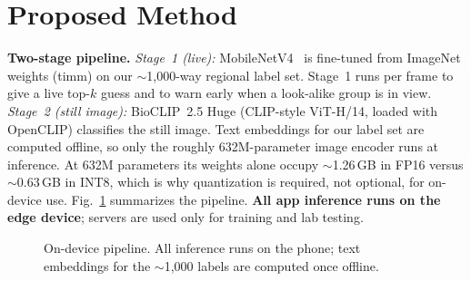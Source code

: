\documentclass[conference,10pt]{IEEEtran}
\begin{document}
\section{Proposed Method}
\textbf{Two-stage pipeline.}
\emph{Stage~1 (live):} MobileNetV4~\cite{qin2024mobilenetv4} is fine-tuned from ImageNet weights (timm) on our
$\sim$1{,}000-way regional label set. Stage~1 runs per frame to give a live top-$k$ guess
and to warn early when a look-alike group is in view.
\emph{Stage~2 (still image):} BioCLIP~2.5 Huge (CLIP-style ViT-H/14, loaded with OpenCLIP)
classifies the still image. Text embeddings for our label set are computed offline, so
only the roughly 632M-parameter image encoder runs at inference.
At 632M parameters its weights alone occupy $\sim$1.26\,GB in FP16 versus
$\sim$0.63\,GB in INT8, which is why quantization is required, not optional, for
on-device use. Fig.~\ref{fig:pipe} summarizes the pipeline.
\textbf{All app inference runs on the edge device}; servers are used only for training and
lab testing.

\begin{figure}[t]
\centering
{}
\caption{On-device pipeline. All inference runs on the phone; text embeddings for
the $\sim$1{,}000 labels are computed once offline.}
\label{fig:pipe}
\end{figure}
\end{document}
